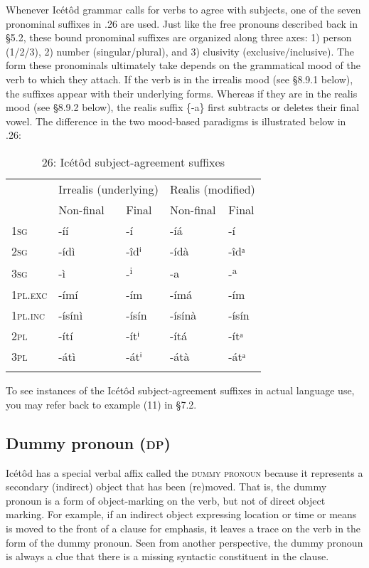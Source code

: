 Whenever Icétôd grammar calls for verbs to agree with subjects, one of the seven pronominal suffixes in .26 are used. Just like the free pronouns described back in §5.2, these bound pronominal suffixes are organized along three axes: 1) person (1/2/3), 2) number (singular/plural), and 3) clusivity (exclusive/inclusive). The form these pronominals ultimately take depends on the grammatical mood of the verb to which they attach. If the verb is in the irrealis mood (see §8.9.1 below), the suffixes appear with their underlying forms. Whereas if they are in the realis mood (see §8.9.2 below), the realis suffix \{-a\} first subtracts or deletes their final vowel. The difference in the two mood-based paradigms is illustrated below in .26:


\begin{table}
\caption{26: Icétôd subject-agreement suffixes}
\label{tab:8}


\begin{tabularx}{\textwidth}{XXXXX} & \multicolumn{2}{X}{Irrealis (underlying)} & \multicolumn{2}{X}{Realis (modified)}\\
\lsptoprule
& Non-final & Final & Non-final & Final\\
\textsc{1sg} & {}-íí & {}-í & {}-íá & {}-í\\
\textsc{2sg} & {}-ídì & {}-îdⁱ & {}-ídà & {}-îdᵃ\\
\textsc{3sg} & {}-ì & {}-\textsuperscript{i} & {}-a & {}-\textsuperscript{a}\\
\textsc{1pl.exc} & {}-ímí & {}-ím & {}-ímá & {}-ím\\
\textsc{1pl.inc} & {}-ísínì & {}-ísín & {}-ísínà & {}-ísín\\
\textsc{2pl} & {}-ítí & {}-ítⁱ & {}-ítá & {}-ítᵃ\\
\textsc{3pl} & {}-átì & {}-átⁱ & {}-átà & {}-átᵃ\\
\lspbottomrule
\end{tabularx}
\end{table}

To see instances of the Icétôd subject-agreement suffixes in actual language use, you may refer back to example (11) in §7.2.




\subsection{Dummy pronoun (\textsc{dp})}


Icétôd has a special verbal affix called the \textsc{dummy pronoun} because it represents a secondary (indirect) object that has been (re)moved. That is, the dummy pronoun is a form of object-marking on the verb, but not of direct object marking. For example, if an indirect object expressing location or time or means is moved to the front of a clause for emphasis, it leaves a trace on the verb in the form of the dummy pronoun. Seen from another perspective, the dummy pronoun is always a clue that there is a missing syntactic constituent in the clause.

